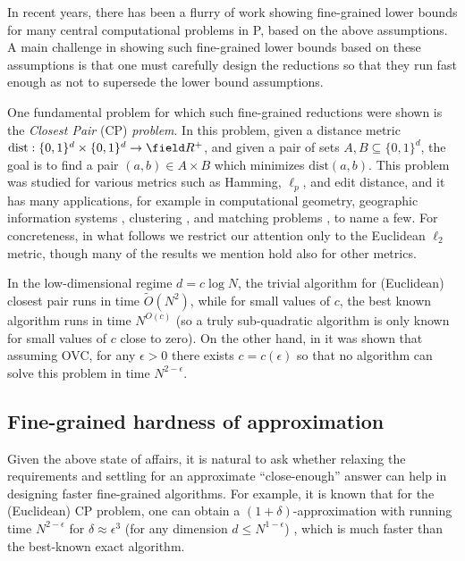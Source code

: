 \documentclass[11pt]{article}
\theoremstyle{plain}
\theoremstyle{remark}
\newcommand{\dist}{\mathrm{dist}}
\begin{document}
In recent years, there has been a flurry of work showing fine-grained lower bounds for many central computational problems in P, based on the above assumptions.  A main challenge in showing such fine-grained lower bounds based on these assumptions  is that one must carefully design the reductions so that they run fast enough as not to supersede the lower bound assumptions. 

One fundamental problem for which such fine-grained reductions were shown is the
\emph{Closest Pair}  (CP) \emph{problem}. In this problem, given a distance metric $\dist: \{0,1\}^d \times \{0,1\}^d \to \field R^+$, and given a pair of sets $A,B\subseteq\{0,1\}^{d}$, the goal is to find a pair $(a,b)\in A\times B$ which minimizes $\dist(a,b)$. 
This problem was studied for various metrics such as Hamming, $\ell_{p}$, and edit distance, and it has many applications, for example in computational geometry, geographic
information systems \cite{Hen06}, clustering \cite{Zah71,Alp10},
and matching problems \cite{WTFX07}, to name a few.
For concreteness, in what follows we restrict our attention only to the Euclidean $\ell_2$ metric, though many of the results we mention hold also for other metrics. 

In the low-dimensional regime $d = c \log N$, the trivial algorithm for (Euclidean) closest pair runs in time $\tilde O(N^2)$, while for small values of $c$,
the best known algorithm  runs in time $N^{O(c)}$
\cite{Rabin76, KM95} (so a truly sub-quadratic algorithm is only known for small values of $c$ close to zero).
  On the other hand, in \cite{AW15} it was shown that assuming OVC, for any $\epsilon>0$ there exists $c = c(\epsilon)$ so that
no algorithm can solve this problem in time $N^{2-\epsilon}$.

\subsection{Fine-grained hardness of approximation}

Given the above state of affairs, it is natural to ask whether relaxing the requirements and settling  
for an approximate ``close-enough'' answer can help in designing faster fine-grained algorithms. For example, it is known that for the (Euclidean) CP problem, one can obtain a $(1+\delta)$-approximation with running time $N^{2-\epsilon}$ for $\delta \approx \epsilon^3$ (for any dimension $d \leq N^{1-\epsilon}$) \cite{ACW16}, which is much faster than the best-known exact algorithm.
\end{document}
